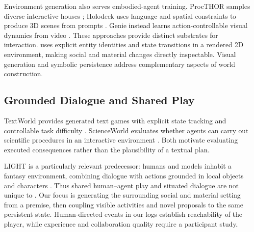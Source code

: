 Environment generation also serves embodied-agent training. ProcTHOR samples
diverse interactive houses \cite{procthor}; Holodeck uses language and spatial
constraints to produce 3D scenes from prompts \cite{holodeck}. Genie instead
learns action-controllable visual dynamics from video \cite{genie}. These
approaches provide distinct substrates for interaction. \agora uses explicit
entity identities and state transitions in a rendered 2D environment, making
social and material changes directly inspectable. Visual generation and
symbolic persistence address complementary aspects of world construction.

\subsection{Grounded Dialogue and Shared Play}
TextWorld provides generated text games with explicit state tracking and
controllable task difficulty \cite{textworld}. ScienceWorld evaluates whether
agents can carry out scientific procedures in an interactive environment
\cite{scienceworld}. Both motivate evaluating executed consequences rather
than the plausibility of a textual plan.

LIGHT is a particularly relevant predecessor: humans and models inhabit a
fantasy environment, combining dialogue with actions grounded in local objects
and characters \cite{light}. Thus shared human--agent play and situated dialogue
are not unique to \agora. Our focus is generating the surrounding social and
material setting from a premise, then coupling visible activities and novel
proposals to the same persistent state. Human-directed events in our logs
establish reachability of the player, while experience and collaboration
quality require a participant study.

